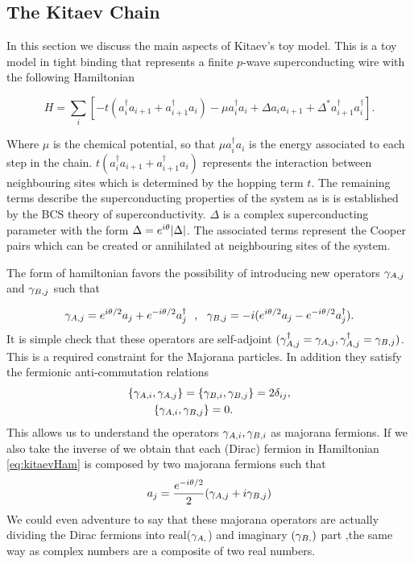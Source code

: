 \subsection{The Kitaev Chain \label{sec:KitaevChain}}
In this section we discuss the main aspects of Kitaev's toy model. This is a toy model in tight binding that represents a  finite $p$-wave superconducting wire with the following Hamiltonian

\begin{equation}
H = \sum_{i} \left[ -t(a_i^{\dagger} a_{i+1} + a_{i+1}^{\dagger}a_i) -\mu a_i^{\dagger} a_{i} +  \Delta a_{i}a_{i+1} + \Delta^* a_{i+1}^{\dagger}a_i^{\dagger} \right].  \label{eq:kitaevHam}
\end{equation}

Where $\mu$ is the chemical potential, so that $\mu a_i^{\dagger} a_{i}$ is the energy associated to each step in the chain. $t(a_i^{\dagger} a_{i+1} + a_{i+1}^{\dagger}a_i)$ represents the interaction between neighbouring sites which is determined by the hopping term $t$. The remaining terms describe the superconducting properties of the system as is is established by the BCS theory of superconductivity. $\Delta$ is a complex superconducting parameter with the form  $\Delta = e^{i\theta} \vert \Delta \vert$. The associated terms represent the Cooper pairs which can be created or annihilated at neighbouring sites of the system.

The form of hamiltonian  favors the possibility of introducing new operators $\gamma_{A,j}$ and $\gamma_{B,j}$ such that

\begin{equation}
\gamma_{A,j} = e^{i\theta /2}a_j+ e^{-i\theta/2 } a^{\dagger}_j \ \ , \ \ \gamma_{B,j} = -i(e^{i\theta /2}a_j - e^{-i\theta/2} a^{\dagger}_j).
\label{eq:majoranaTrans}
\end{equation}
It is simple check that these operators are self-adjoint $(\gamma_{A,j}^\dagger = \gamma_{A,j}, \gamma_{A,j}^\dagger = \gamma_{B,j})$. This is a required constraint for the Majorana particles. In addition they satisfy the fermionic anti-commutation relations
\begin{equation}
\begin{aligned}
\{\gamma_{A,i}, \gamma_{A,j}\} = \{ & \gamma_{B,i} , \gamma_{B,j}\} = 2\delta_{ij}  ,\\ 
  \{\gamma_{A,i}, \gamma_{B,j} & \} =0.
\end{aligned} 
\label{majoranaRel}
\end{equation} 
This allows us to understand the operators $\gamma_{A,i} , \gamma_{B,i}$ as majorana fermions. If we also take the inverse of  we obtain that each  (Dirac) fermion in Hamiltonian \eqref{eq:kitaevHam} is composed by two majorana fermions such that 
$$a_j = \frac{e^{-i\theta/2}}{2}(\gamma_{A,j}+ i\gamma_{B,j})$$
We could even adventure to say that these majorana operators are actually dividing the Dirac fermions into real($\gamma_{A,}$) and imaginary $(\gamma_{B,})$ part ,the same way as complex numbers are a composite of two real numbers. 

